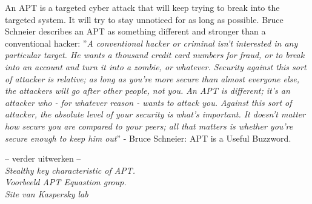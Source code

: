 An APT is a targeted cyber attack that will keep trying to break into the targeted system. It will try to stay unnoticed for as long as possible. Bruce Schneier describes an APT as something different and stronger than a conventional hacker: ''\textit{A conventional hacker or criminal isn't interested in any particular target. He wants a thousand credit card numbers for fraud, or to break into an account and turn it into a zombie, or whatever. Security against this sort of attacker is relative; as long as you're more secure than almost everyone else, the attackers will go after other people, not you. An APT is different; it's an attacker who - for whatever reason - wants to attack you. Against this sort of attacker, the absolute level of your security is what's important. It doesn't matter how secure you are compared to your peers; all that matters is whether you're secure enough to keep him out}'' - Bruce Schneier: APT is a Useful Buzzword.

-- verder uitwerken -- \\
\textit{Stealthy key characteristic of APT. \\
Voorbeeld APT Equastion group. \\
Site van Kaspersky lab\\}

